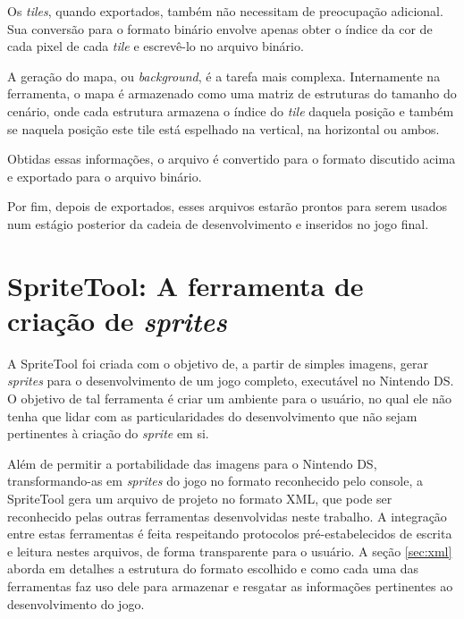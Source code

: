 \documentclass[brazil]{abnt}
\begin{document}
Os \textit{tiles}, quando exportados, também não necessitam de preocupação adicional. Sua conversão para o formato binário envolve apenas obter o índice da cor de cada pixel de cada \textit{tile} e escrevê-lo no arquivo binário.

A geração do mapa, ou \textit{background}, é a tarefa mais complexa. Internamente na ferramenta, o mapa é armazenado como uma matriz de estruturas do tamanho do cenário, onde cada estrutura armazena o índice do \textit{tile} daquela posição e também se naquela posição este tile está espelhado na vertical, na horizontal ou ambos. 

Obtidas essas informações, o arquivo é convertido para o formato discutido acima e exportado para o arquivo binário.



Por fim, depois de exportados, esses arquivos estarão prontos para serem usados num estágio posterior da cadeia de desenvolvimento e inseridos no jogo final.

\section{SpriteTool: A ferramenta de criação de \textit{sprites}}

A SpriteTool foi criada com o objetivo de, a partir de simples imagens, gerar \textit{sprites} para o desenvolvimento de um jogo completo, executável no Nintendo DS. O objetivo de tal ferramenta é criar um ambiente para o usuário, no qual ele não tenha que lidar com as particularidades do desenvolvimento que não sejam pertinentes à criação do \textit{sprite} em si.

Além de permitir a portabilidade das imagens para o Nintendo DS, transformando-as em \textit{sprites} do jogo no formato reconhecido pelo console, a SpriteTool gera um arquivo de projeto no formato XML, que pode ser reconhecido pelas outras ferramentas desenvolvidas neste trabalho. A integração entre estas ferramentas é feita respeitando protocolos pré-estabelecidos de escrita e leitura nestes arquivos, de forma transparente para o usuário. A seção \ref{sec:xml} aborda em detalhes a estrutura do formato escolhido e como cada uma das ferramentas faz uso dele para armazenar e resgatar as informações pertinentes ao desenvolvimento do jogo.
\end{document}
